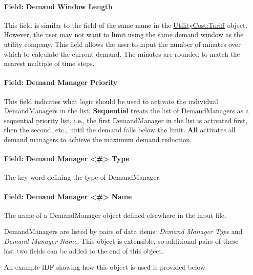 \paragraph{Field: Demand Window Length}\label{field-demand-window-length}

This field is similar to the field of the same name in the \hyperref[utilitycosttariff]{UtilityCost:Tariff} object. However, the user may not want to limit using the same demand window as the utility company. This field allows the user to input the number of minutes over which to calculate the current demand. The minutes are rounded to match the nearest multiple of time steps.

\paragraph{Field: Demand Manager Priority}\label{field-demand-manager-priority}

This field indicates what logic should be used to activate the individual DemandManagers in the list. \textbf{Sequential} treats the list of DemandManagers as a sequential priority list, i.e., the first DemandManager in the list is activated first, then the second, etc., until the demand falls below the limit. \textbf{All} activates all demand managers to achieve the maximum demand reduction.

\paragraph{Field: Demand Manager \textless{}\#\textgreater{} Type}\label{field-demand-manager-type-1}

The key word defining the type of DemandManager.

\paragraph{Field: Demand Manager \textless{}\#\textgreater{} Name}\label{field-demand-manager-name-1}

The name of a DemandManager object defined elsewhere in the input file.

DemandManagers are listed by pairs of data items: \emph{Demand Manager Type} and \emph{Demand Manager Name}. This object is extensible, so additional pairs of these last two fields can be added to the end of this object.

An example IDF showing how this object is used is provided below:

